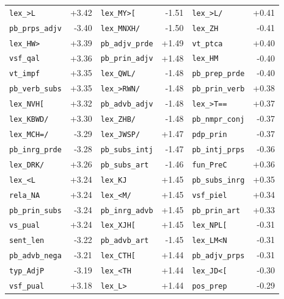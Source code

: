 \begin{longtable}{lrlrlr}
\texttt{lex\_\textgreater{}L} & +3.42 & \texttt{lex\_MY\textgreater{}[} & -1.51 & \texttt{lex\_\textgreater{}L/} & +0.41 \\
\texttt{pb\_prps\_adjv} & -3.40 & \texttt{lex\_MNXH/} & -1.50 & \texttt{lex\_ZH} & -0.41 \\
\texttt{lex\_HW\textgreater{}} & +3.39 & \texttt{pb\_adjv\_prde} & +1.49 & \texttt{vt\_ptca} & +0.40 \\
\texttt{vsf\_qal} & +3.36 & \texttt{pb\_prin\_adjv} & +1.48 & \texttt{lex\_HM} & -0.40 \\
\texttt{vt\_impf} & +3.35 & \texttt{lex\_QWL/} & -1.48 & \texttt{pb\_prep\_prde} & -0.40 \\
\texttt{pb\_verb\_subs} & +3.35 & \texttt{lex\_\textgreater{}RWN/} & -1.48 & \texttt{pb\_prin\_verb} & +0.38 \\
\texttt{lex\_NVH[} & +3.32 & \texttt{pb\_advb\_adjv} & -1.48 & \texttt{lex\_\textgreater{}T==} & +0.37 \\
\texttt{lex\_KBWD/} & +3.30 & \texttt{lex\_ZHB/} & -1.48 & \texttt{pb\_nmpr\_conj} & -0.37 \\
\texttt{lex\_MCH=/} & -3.29 & \texttt{lex\_JWSP/} & +1.47 & \texttt{pdp\_prin} & -0.37 \\
\texttt{pb\_inrg\_prde} & -3.28 & \texttt{pb\_subs\_intj} & -1.47 & \texttt{pb\_intj\_prps} & -0.36 \\
\texttt{lex\_DRK/} & +3.26 & \texttt{pb\_subs\_art} & -1.46 & \texttt{fun\_PreC} & +0.36 \\
\texttt{lex\_\textless{}L} & +3.24 & \texttt{lex\_KJ} & +1.45 & \texttt{pb\_subs\_inrg} & +0.35 \\
\texttt{rela\_NA} & +3.24 & \texttt{lex\_\textless{}M/} & +1.45 & \texttt{vsf\_piel} & +0.34 \\
\texttt{pb\_prin\_subs} & -3.24 & \texttt{pb\_inrg\_advb} & +1.45 & \texttt{pb\_prin\_art} & +0.33 \\
\texttt{vs\_pual} & +3.24 & \texttt{lex\_XJH[} & +1.45 & \texttt{lex\_NPL[} & -0.31 \\
\texttt{sent\_len} & -3.22 & \texttt{pb\_advb\_art} & -1.45 & \texttt{lex\_LM\textless{}N} & -0.31 \\
\texttt{pb\_advb\_nega} & -3.21 & \texttt{lex\_CTH[} & +1.44 & \texttt{pb\_adjv\_prps} & -0.31 \\
\texttt{typ\_AdjP} & -3.19 & \texttt{lex\_\textless{}TH} & +1.44 & \texttt{lex\_JD\textless{}[} & -0.30 \\
\texttt{vsf\_pual} & +3.18 & \texttt{lex\_L\textgreater{}} & +1.44 & \texttt{pos\_prep} & -0.29 \\

\end{longtable}
